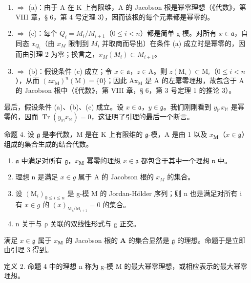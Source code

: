 \begin{enumerate}
\def\labelenumi{(\alph{enumi})}
\setcounter{enumi}{1}
\item
  \(\Rightarrow\) (a)：由于 A 在 K 上有限维，A 的 Jacobson 根是幂零理想（《代数》，第 VIII 章，§ 6，第 4 号定理 3），因而该根的每个元素都是幂零的。
\item
  \(\Rightarrow\) (c)：每个 \(Q_{i} = M_{i}/M_{i+1}\)（\(0 \leqslant i < n\)）都是简单 g-模。对所有 \(x \in \mathfrak{a}\)，自同态 \(x_{Q_{i}}\)（由 \(x_{M}\) 限制到 \(M_{i}\) 并取商而导出）在条件 (a) 成立时是幂零的，因而由引理 2 为零；换言之，\(x_{M}(M_{i}) \subset M_{i+1}\)。
\item
  \(\Rightarrow\) (b)：假设条件 (c) 成立；令 \(x\in\mathfrak{a}\)，\(z\in\mathrm{A}\)。则 \(z(\mathrm{M}_{i})\subset\mathrm{M}_{i}\)（\(0\leqslant i<n\)），从而 \((zx_{\mathrm{M}})^{n}(\mathrm{M})=\{0\}\)；因此 \(\mathrm{Ax}_{\mathrm{M}}\) 是 A 的左幂零理想，故包含于 A 的 Jacobson 根中（《代数》，第 VIII 章，§ 6，第 3 号定理 1 的推论 3）。
\end{enumerate}

最后，假设条件 (a)、(b)、(c) 成立。设 \(x \in \mathfrak{a}\)，\(y \in \mathfrak{g}\)。我们刚刚看到 \(y_{\mathbb{M}}x_{\mathbb{M}}\) 是幂零的，因而 \(\operatorname{Tr}(y_{\mathbb{M}}x_{\mathbb{M}}) = 0\)，这证明了引理的最后一个断言。

命题 4. 设 \(\mathfrak{g}\) 是李代数，M 是在 K 上有限维的 \(\mathfrak{g}\)-模，A 是由 1 以及 \(x_{\mathbf{M}}\)（\(x \in \mathfrak{g}\)）组成的集合生成的结合代数。

\begin{enumerate}
\def\labelenumi{(\alph{enumi})}
\item
  \(\mathfrak{a}\) 中满足对所有 \(\mathfrak{g}\)，\(x_{\mathbf{M}}\) 幂零的理想 \(x \in \mathfrak{a}\) 都包含于其中一个理想 \(\mathfrak{n}\) 中。
\item
  理想 n 是满足 \(x \in g\) 属于 A 的 Jacobson 根的 \(x_{M}\) 的集合。
\item
  设 \((\mathrm{M}_{i})_{0\leqslant i\leqslant n}\) 是 g-模 M 的 Jordan-Hölder 序列；则 n 也是满足对所有 i 有 \(x \in g\) 的 \((x)_{\mathrm{M}_{i}/\mathrm{M}_{i+1}} = 0\) 的集合。
\item
  n 关于与 ρ 关联的双线性形式与 g 正交。
\end{enumerate}

满足 \(x \in \mathfrak{g}\) 属于 \(x_{\mathbf{M}}\) 的 Jacobson 根的 \(\mathbf{A}\) 的集合显然是 \(\mathfrak{g}\) 的理想。命题于是立即由引理 3 得到。

定义 2. 命题 4 中的理想 n 称为 g-模 M 的最大幂零理想，或相应表示的最大幂零理想。

